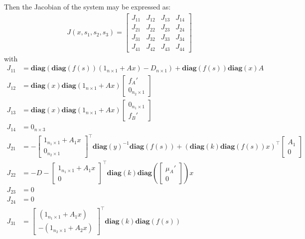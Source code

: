 \documentclass[3p,times]{article}
\newcommand{\diag}{\textbf{diag}}
\begin{document}
Then the Jacobian of the system may be expressed as:
\begin{align}
\label{Jacobian_system}
 J(x,s_1,s_2,s_3) = \begin{bmatrix}
J_{11} & J_{12} & J_{13} & J_{14} \\
J_{21} & J_{22} & J_{23} & J_{24} \\
J_{31} & J_{32} & J_{33} & J_{34} \\
J_{41} & J_{42} & J_{43} & J_{44} 
\end{bmatrix} 
\end{align} 
with 
\begin{align}
J_{11} &=  \diag(\diag(f(s))(1_{n\times 1} +Ax)-D_{n\times 1})
+\diag(f(s))\diag(x)A \\
J_{12} &= \diag(x)\diag(1_{n \times 1}+Ax)\begin{bmatrix} f_A' \\ 0_{n_2 \times 1} \end{bmatrix}  \\
J_{13} &=\diag(x)\diag(1_{n\times 1}+Ax)\begin{bmatrix} 0_{n_1 \times 1} \\ f_B' \end{bmatrix} \\
J_{14} &= 0_{n\times 3}\\
J_{21} &= -\begin{bmatrix}
1_{n_1 \times 1} + A_1 x \\ 0_{n_2 \times 1} \end{bmatrix}^\top \diag(y)^{-1} \diag (f(s))  + (\diag(k)\diag(f(s))x)^\top\begin{bmatrix} A_1 \\ 0 \end{bmatrix}  \\
J_{22} &= -D  - \begin{bmatrix} 1_{n_1 \times 1} + A_1x \\ 0 \end{bmatrix}^\top \diag(k) \diag\left( \begin{bmatrix}\mu_A' \\ 0 \end{bmatrix}\right)x \\
J_{23} & = 0 \\
J_{24} &= 0 \\
J_{31} &= \begin{bmatrix} \left(1_{n_1 \times 1}+A_1x \right)\\ - \left(1_{n_2 \times 1} + A_2x \right)  \end{bmatrix}^\top \diag(k) \diag(f(s)) 

\end{align}
\end{document}
